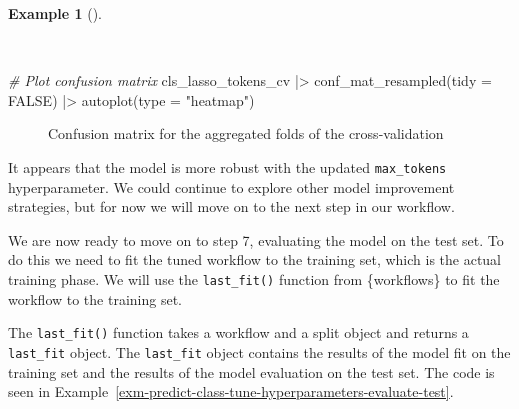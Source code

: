 \documentclass[
  letterpaper,
]{book}
\newenvironment{Shaded}{\begin{snugshade}}{\end{snugshade}}
\newcommand{\AttributeTok}[1]{\textcolor[rgb]{0.00,0.00,0.00}{#1}}
\newcommand{\CommentTok}[1]{\textcolor[rgb]{0.00,0.00,0.00}{\textit{#1}}}
\newcommand{\ConstantTok}[1]{\textcolor[rgb]{0.00,0.00,0.00}{#1}}
\newcommand{\FunctionTok}[1]{\textcolor[rgb]{0.00,0.00,0.00}{#1}}
\newcommand{\NormalTok}[1]{\textcolor[rgb]{0.00,0.00,0.00}{#1}}
\newcommand{\SpecialCharTok}[1]{\textcolor[rgb]{0.00,0.00,0.00}{#1}}
\newcommand{\StringTok}[1]{\textcolor[rgb]{0.00,0.00,0.00}{#1}}
\theoremstyle{definition}
\newtheorem{example}{Example}[chapter]
\theoremstyle{remark}
\begin{document}
\begin{example}[]\protect\hypertarget{exm-predict-class-tune-hyperparameters-tokenfilter-evaluate-workflow-cv-confusion}{}\label{exm-predict-class-tune-hyperparameters-tokenfilter-evaluate-workflow-cv-confusion}

~

\begin{Shaded}
\begin{Highlighting}[]
\CommentTok{\# Plot confusion matrix}
\NormalTok{cls\_lasso\_tokens\_cv }\SpecialCharTok{|\textgreater{}}
  \FunctionTok{conf\_mat\_resampled}\NormalTok{(}\AttributeTok{tidy =} \ConstantTok{FALSE}\NormalTok{) }\SpecialCharTok{|\textgreater{}}
  \FunctionTok{autoplot}\NormalTok{(}\AttributeTok{type =} \StringTok{"heatmap"}\NormalTok{)}
\end{Highlighting}
\end{Shaded}

\begin{figure}[!htb]


\caption{\label{fig-predict-class-tune-hyperparameters-tokenfilter-evaluate-workflow-cv-confusion}Confusion
matrix for the aggregated folds of the cross-validation}

\end{figure}%

\end{example}

It appears that the model is more robust with the updated
\texttt{max\_tokens} hyperparameter. We could continue to explore other
model improvement strategies, but for now we will move on to the next
step in our workflow.

We are now ready to move on to step 7, evaluating the model on the test
set. To do this we need to fit the tuned workflow to the training set,
which is the actual training phase. We will use the \texttt{last\_fit()}
function from \{workflows\} to fit the workflow to the training set.

The \texttt{last\_fit()} function takes a workflow and a split object
and returns a \texttt{last\_fit} object. The \texttt{last\_fit} object
contains the results of the model fit on the training set and the
results of the model evaluation on the test set. The code is seen in
Example~\ref{exm-predict-class-tune-hyperparameters-evaluate-test}.
\end{document}
